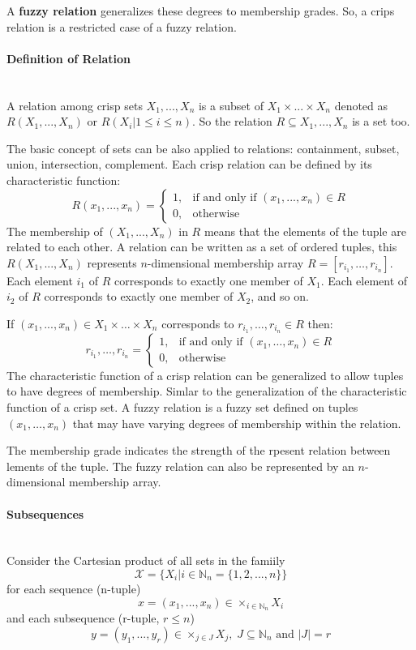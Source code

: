 \documentclass{article}
\begin{document}
A \textbf{fuzzy relation} generalizes these degrees to membership grades. So, a crips relation is a
restricted case of a fuzzy relation.

\paragraph{Definition of Relation}\mbox{}\\
A relation among crisp sets $X_1,...,X_n$ is a subset of $X_1\times ...\times X_n$ denoted as
$R(X_1,...,X_n)$ or $R(X_i|1\leq i\leq n)$. So the relation $R\subseteq X_1,...,X_n$ is a set too.

The basic concept of sets can be also applied to relations: containment, subset, union, intersection, complement.
Each crisp relation can be defined by its characteristic function:
\[
    R(x_1,...,x_n)=
    \begin{cases}
        1, & \text{if and only if }(x_1,...,x_n)\in R \\
        0, & \text{otherwise}
    \end{cases}
\]
The membership of $(X_1,...,X_n)$ in $R$ means that the elements of the tuple are related to each other.
A relation can be written as a set of ordered tuples, this $R(X_1,...,X_n)$ represents $n$-dimensional
membership array $R=[r_{i_1},\dots,r_{i_n}]$. Each element $i_1$ of $R$ corresponds to exactly one
member of $X_1$. Each element of $i_2$ of $R$ corresponds to exactly one member of $X_2$, and so on.

If $(x_1,...,x_n)\in X_1\times\dots\times X_n$ corresponds to $r_{i_1},\dots,r_{i_{n}}\in R$ then:
\[
    r_{i_1},\dots,r_{i_{n}}=
    \begin{cases}
        1, & \text{if and only if }(x_1,\dots,x_n)\in R \\
        0, & \text{otherwise}
    \end{cases}
\]
The characteristic function of a crisp relation can be generalized to allow tuples to have degrees of
membership. Simlar to the generalization of the characteristic function of a crisp set. A fuzzy relation
is a fuzzy set defined on tuples $(x_1,\dots,x_n)$ that may have varying degrees of membership within
the relation.

The membership grade indicates the strength of the rpesent relation between lements of the tuple. The
fuzzy relation can also be represented by an $n$-dimensional membership array.

\paragraph{Subsequences}\mbox{}\\
Consider the Cartesian product of all sets in the famiily
$$\mathcal{X}=\{X_i|i\in\mathbb{N}_n =\{1,2,...,n\}\}$$
for each sequence (n-tuple)
$$x=(x_1,...,x_n)\in\times_{i\in\mathbb{N}_n}X_i$$
and each subsequence (r-tuple, $r\leq n$)
$$y=(y_1,...,y_r)\in\times_{j\in J}X_j,\;J\subseteq\mathbb{N}_n\text{ and }|J|=r$$
\end{document}
